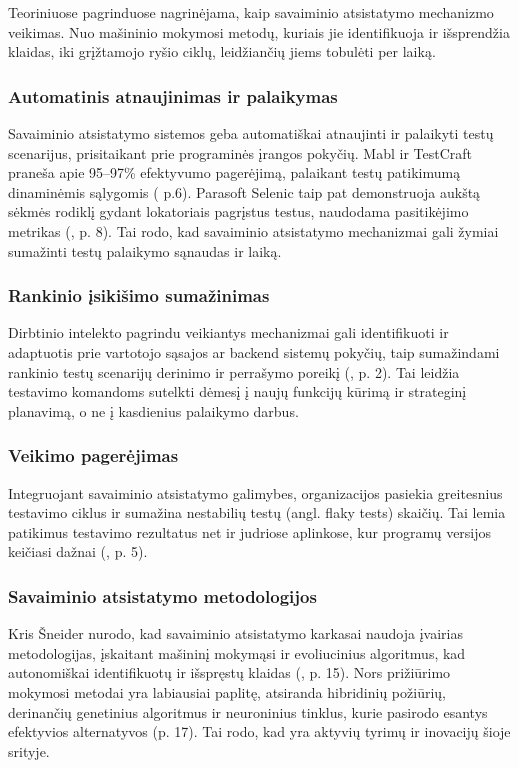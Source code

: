 \documentclass[
]{VUMIFPSkursinis}
\begin{document}
Teoriniuose pagrinduose nagrinėjama, kaip savaiminio atsistatymo mechanizmo veikimas. Nuo mašininio mokymosi metodų, kuriais jie identifikuoja ir išsprendžia klaidas, iki grįžtamojo ryšio ciklų, leidžiančių jiems tobulėti per laiką.

\subsubsection{Automatinis atnaujinimas ir palaikymas}
Savaiminio atsistatymo sistemos geba automatiškai atnaujinti ir palaikyti testų scenarijus, prisitaikant prie programinės įrangos pokyčių. Mabl ir TestCraft praneša apie 95–97\% efektyvumo pagerėjimą, palaikant testų patikimumą dinaminėmis sąlygomis (\cite{Garousi2024} p.6). Parasoft Selenic taip pat demonstruoja aukštą sėkmės rodiklį gydant lokatoriais pagrįstus testus, naudodama pasitikėjimo metrikas (\cite{Garousi2024}, p. 8). Tai rodo, kad savaiminio atsistatymo mechanizmai gali žymiai sumažinti testų palaikymo sąnaudas ir laiką.

\subsubsection{Rankinio įsikišimo sumažinimas}
Dirbtinio intelekto pagrindu veikiantys mechanizmai gali identifikuoti ir adaptuotis prie vartotojo sąsajos ar backend sistemų pokyčių, taip sumažindami rankinio testų scenarijų derinimo ir perrašymo poreikį (\cite[2]{SSRN2023}, p. 2). Tai leidžia testavimo komandoms sutelkti dėmesį į naujų funkcijų kūrimą ir strateginį planavimą, o ne į kasdienius palaikymo darbus.
\subsubsection{Veikimo pagerėjimas}
Integruojant savaiminio atsistatymo galimybes, organizacijos pasiekia greitesnius testavimo ciklus ir sumažina nestabilių testų (angl. flaky tests) skaičių. Tai lemia patikimus testavimo rezultatus net ir judriose aplinkose, kur programų versijos keičiasi dažnai (\cite{SSRN2023}, p. 5).

\subsubsection{Savaiminio atsistatymo metodologijos}
Kris Šneider nurodo, kad savaiminio atsistatymo karkasai naudoja įvairias metodologijas, įskaitant mašininį mokymąsi ir evoliucinius algoritmus, kad autonomiškai identifikuotų ir išspręstų klaidas (\cite{Schneider2013}, p. 15). Nors prižiūrimo mokymosi metodai yra labiausiai paplitę, atsiranda hibridinių požiūrių, derinančių genetinius algoritmus ir neuroninius tinklus, kurie pasirodo esantys efektyvios alternatyvos (p. 17). Tai rodo, kad yra aktyvių tyrimų ir inovacijų šioje srityje.
\end{document}
